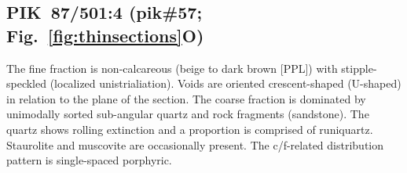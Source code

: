\documentclass[a4paper]{article}
\begin{document}
\newpage\subsection{PIK~87/501:4 (pik\#57; Fig.~\ref{fig:thinsections}O)}

\begin{multicols}{2}
\noindent The fine fraction is non-calcareous (beige to dark brown [PPL]) with stipple-speckled (localized unistrialiation). Voids are oriented crescent-shaped (U-shaped) in relation to the plane of the section. The coarse fraction is dominated by unimodally sorted sub-angular quartz and rock fragments (sandstone). The quartz shows rolling extinction and a proportion is comprised of runiquartz. Staurolite and muscovite are occasionally present. The c/f-related distribution pattern is single-spaced porphyric.
\end{multicols}

\end{document}
